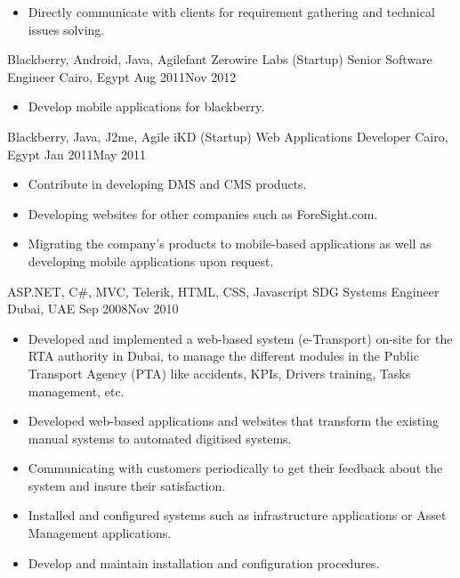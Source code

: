 \begin{experiences}
{\begin{itemize}
                \item Directly communicate with clients for requirement gathering and technical issues solving.
            \end{itemize}
        }
        {Blackberry, Android, Java, Agilefant}
    \emptySeparator
    \experience
        {Zerowire Labs (Startup)}   {Senior Software Engineer}
        {Cairo, Egypt}
        {Aug 2011}{Nov 2012}
        {
            \begin{itemize}
                \item Develop mobile applications for blackberry.
            \end{itemize}
        }
        {Blackberry, Java, J2me, Agile}
    \emptySeparator
    \experience
        {iKD (Startup)}   {Web Applications Developer}
        {Cairo, Egypt}
        {Jan 2011}{May 2011}
        {
            \begin{itemize}
                \item Contribute in developing DMS and CMS products.
                \item Developing websites for other companies such as ForeSight.com.
                \item Migrating the company’s products to mobile-based applications as
                well as developing mobile applications upon request.
            \end{itemize}
        }
        {ASP.NET, {C\#}, MVC, Telerik, HTML, CSS, Javascript}
    \emptySeparator
    \experience
        {SDG}   {Systems Engineer}
        {Dubai, UAE}
        {Sep 2008}{Nov 2010}
        {
            \begin{itemize}
                \item Developed and implemented a web-based system (e-Transport)
                on-site for the RTA authority in Dubai, to manage the different modules in the Public Transport Agency (PTA) like accidents, KPIs, Drivers training, Tasks management, etc.
                \item Developed web-based applications and websites that transform the existing manual systems to automated digitised systems.
                \item Communicating with customers periodically to get their feedback about the system and insure their satisfaction.
                \item Installed and configured systems such as infrastructure
                applications or Asset Management applications.
                \item Develop and maintain installation and configuration procedures.

\end{itemize}}
\end{experiences}
